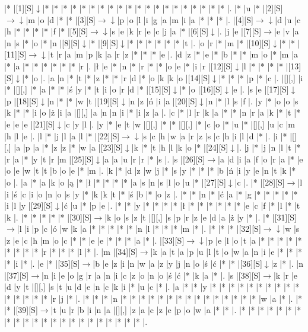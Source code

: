 \documentclass[11pt]{article}
\newcommand\drarr{$\rightarrow \!\!\!\!\! \downarrow$}
\newcommand\rarr{$\rightarrow$}
\newcommand\darr{$\downarrow$}
\begin{document}
\noindent\begin{Puzzle}{21}{33}|*	|[1][S]\darr	|*	|*	|*	|*	|*	|*	|*	|*	|*	|*	|*	|*	|*	|*	|*	|*	|*	|*	|*	|*	|.
|*	|u	|*	|[2][S]\drarr	|m	|o	|d	|*	|*	|[3][S]\drarr	|p	|o	|l	|i	|g	|a	|m	|i	|a	|*	|*	|*	|.
|[4][S]\drarr	|d	|u	|c	|h	|*	|*	|*	|*	|f	|*	|[5][S]\drarr	|s	|e	|k	|r	|e	|c	|j	|a	|*	|[6][S]\darr	|.
|j	|e	|[7][S]\rarr	|e	|v	|a	|n	|s	|*	|o	|*	|n	|[8][S]\darr	|*	|[9][S]\darr	|*	|*	|*	|*	|*	|*	|t	|.
|o	|r	|*	|m	|*	|[10][S]\darr	|*	|*	|[11][S]\drarr	|t	|r	|a	|m	|p	|k	|a	|r	|z	|*	|*	|*	|e	|.
|d	|z	|*	|e	|*	|b	|*	|*	|m	|o	|*	|m	|a	|*	|a	|*	|*	|*	|*	|*	|*	|r	|.
|ł	|e	|*	|n	|*	|r	|*	|*	|o	|e	|*	|i	|r	|[12][S]\darr	|l	|*	|*	|*	|*	|[13][S]\darr	|*	|o	|.
|a	|n	|*	|t	|*	|z	|*	|*	|r	|d	|*	|o	|k	|k	|o	|[14][S]\darr	|*	|*	|*	|p	|*	|c	|.
|[][,]{ }	|i	|*	|[][,]{ }	|*	|a	|*	|*	|ś	|y	|*	|t	|i	|o	|r	|d	|*	|[15][S]\darr	|*	|o	|[16][S]\darr	|e	|.
|s	|e	|[17][S]\darr	|p	|[18][S]\darr	|n	|*	|*	|w	|t	|[19][S]\darr	|n	|z	|ń	|i	|a	|[20][S]\darr	|n	|*	|l	|s	|f	|.
|y	|*	|o	|o	|s	|k	|*	|*	|i	|o	|ż	|i	|a	|[][,]{ }	|a	|n	|n	|i	|*	|i	|z	|a	|.
|c	|*	|l	|r	|k	|a	|*	|*	|n	|r	|a	|k	|*	|t	|*	|e	|e	|e	|[21][S]\darr	|c	|y	|l	|.
|y	|*	|e	|t	|w	|[][,]{ }	|*	|*	|[][,]{ }	|*	|c	|o	|*	|u	|*	|[][,]{ }	|u	|c	|m	|h	|l	|e	|.
|l	|*	|j	|l	|a	|l	|*	|[22][S]\drarr	|s	|c	|h	|w	|a	|r	|z	|s	|c	|h	|i	|l	|d	|*	|.
|i	|*	|[][,]{ }	|a	|p	|a	|*	|z	|z	|*	|w	|a	|[23][S]\darr	|k	|*	|t	|h	|l	|k	|o	|*	|[24][S]\darr	|.
|j	|*	|j	|n	|l	|t	|*	|r	|a	|*	|y	|t	|r	|m	|[25][S]\darr	|a	|a	|u	|r	|r	|*	|s	|.
|s	|[26][S]\rarr	|a	|d	|i	|a	|f	|o	|r	|a	|*	|e	|o	|e	|w	|t	|t	|b	|o	|e	|*	|m	|.
|k	|*	|d	|z	|w	|j	|*	|s	|y	|*	|*	|*	|b	|ń	|i	|y	|e	|n	|t	|k	|*	|o	|.
|a	|*	|a	|k	|o	|ą	|*	|ł	|*	|*	|*	|*	|a	|s	|n	|s	|l	|o	|u	|*	|[27][S]\darr	|c	|.
|*	|[28][S]\rarr	|l	|i	|ś	|c	|i	|o	|n	|o	|s	|y	|*	|k	|k	|t	|*	|ś	|b	|*	|o	|z	|.
|*	|*	|n	|*	|ć	|a	|*	|g	|*	|*	|*	|*	|*	|i	|l	|y	|[29][S]\darr	|ć	|u	|*	|p	|e	|.
|*	|*	|y	|*	|*	|*	|*	|ł	|*	|*	|*	|*	|*	|*	|e	|c	|f	|*	|l	|*	|t	|k	|.
|*	|*	|*	|*	|*	|[30][S]\rarr	|k	|o	|s	|z	|t	|[][,]{ }	|s	|p	|r	|z	|e	|d	|a	|ż	|y	|*	|.
|*	|[31][S]\rarr	|l	|i	|p	|c	|ó	|w	|k	|a	|*	|*	|*	|*	|*	|n	|l	|*	|*	|*	|m	|*	|.
|*	|*	|*	|[32][S]\drarr	|w	|s	|z	|e	|c	|h	|m	|o	|c	|*	|*	|e	|e	|*	|*	|*	|a	|*	|.
|[33][S]\drarr	|p	|e	|l	|o	|t	|a	|*	|*	|*	|*	|*	|*	|*	|*	|*	|r	|*	|*	|*	|l	|*	|.
|m	|[34][S]\rarr	|k	|a	|t	|a	|p	|u	|l	|t	|o	|w	|a	|n	|i	|e	|*	|*	|*	|*	|i	|*	|.
|e	|*	|[35][S]\rarr	|b	|e	|z	|i	|n	|w	|a	|z	|y	|j	|n	|o	|ś	|ć	|*	|*	|[36][S]\darr	|z	|*	|.
|n	|[37][S]\rarr	|n	|i	|e	|o	|g	|r	|a	|n	|i	|c	|z	|o	|n	|o	|ś	|ć	|*	|k	|a	|*	|.
|s	|[38][S]\rarr	|k	|r	|e	|d	|y	|t	|[][,]{ }	|s	|t	|u	|d	|e	|n	|c	|k	|i	|*	|u	|c	|*	|.
|a	|*	|*	|y	|*	|*	|*	|*	|*	|*	|*	|*	|*	|*	|*	|*	|*	|*	|*	|r	|j	|*	|.
|*	|*	|*	|n	|*	|*	|*	|*	|*	|*	|*	|*	|*	|*	|*	|*	|*	|*	|*	|w	|a	|*	|.
|*	|*	|[39][S]\rarr	|t	|u	|r	|b	|i	|n	|a	|[][,]{ }	|z	|a	|c	|z	|e	|p	|o	|w	|a	|*	|*	|.
|*	|*	|*	|*	|*	|*	|*	|*	|*	|*	|*	|*	|*	|*	|*	|*	|*	|*	|*	|*	|*	|*	|.\end{Puzzle}
\end{document}
